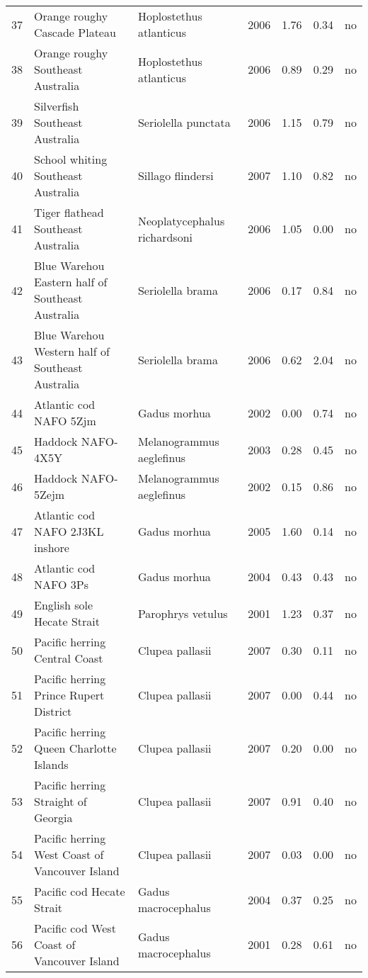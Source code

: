 \begin{table}[ht]
\begin{center}
\begin{tabular}{rllrrrl}
  37 & Orange roughy Cascade Plateau & Hoplostethus atlanticus & 2006 & 1.76 & 0.34 & no \\
  38 & Orange roughy Southeast Australia & Hoplostethus atlanticus & 2006 & 0.89 & 0.29 & no \\
  39 & Silverfish Southeast Australia & Seriolella punctata & 2006 & 1.15 & 0.79 & no \\
  40 & School whiting Southeast Australia & Sillago flindersi & 2007 & 1.10 & 0.82 & no \\
  41 & Tiger flathead Southeast Australia & Neoplatycephalus richardsoni & 2006 & 1.05 & 0.00 & no \\
  42 & Blue Warehou Eastern half of Southeast Australia & Seriolella brama & 2006 & 0.17 & 0.84 & no \\
  43 & Blue Warehou Western half of Southeast Australia & Seriolella brama & 2006 & 0.62 & 2.04 & no \\
  44 & Atlantic cod NAFO 5Zjm & Gadus morhua & 2002 & 0.00 & 0.74 & no \\
  45 & Haddock NAFO-4X5Y & Melanogrammus aeglefinus & 2003 & 0.28 & 0.45 & no \\
  46 & Haddock NAFO-5Zejm & Melanogrammus aeglefinus & 2002 & 0.15 & 0.86 & no \\
  47 & Atlantic cod NAFO 2J3KL inshore & Gadus morhua & 2005 & 1.60 & 0.14 & no \\
  48 & Atlantic cod NAFO 3Ps & Gadus morhua & 2004 & 0.43 & 0.43 & no \\
  49 & English sole Hecate Strait & Parophrys vetulus & 2001 & 1.23 & 0.37 & no \\
  50 & Pacific herring Central Coast & Clupea pallasii & 2007 & 0.30 & 0.11 & no \\
  51 & Pacific herring Prince Rupert District & Clupea pallasii & 2007 & 0.00 & 0.44 & no \\
  52 & Pacific herring Queen Charlotte Islands & Clupea pallasii & 2007 & 0.20 & 0.00 & no \\
  53 & Pacific herring Straight of Georgia & Clupea pallasii & 2007 & 0.91 & 0.40 & no \\
  54 & Pacific herring West Coast of Vancouver Island & Clupea pallasii & 2007 & 0.03 & 0.00 & no \\
  55 & Pacific cod Hecate Strait & Gadus macrocephalus & 2004 & 0.37 & 0.25 & no \\
  56 & Pacific cod West Coast of Vancouver Island & Gadus macrocephalus & 2001 & 0.28 & 0.61 & no \\

\end{tabular}
\end{center}
\end{table}

